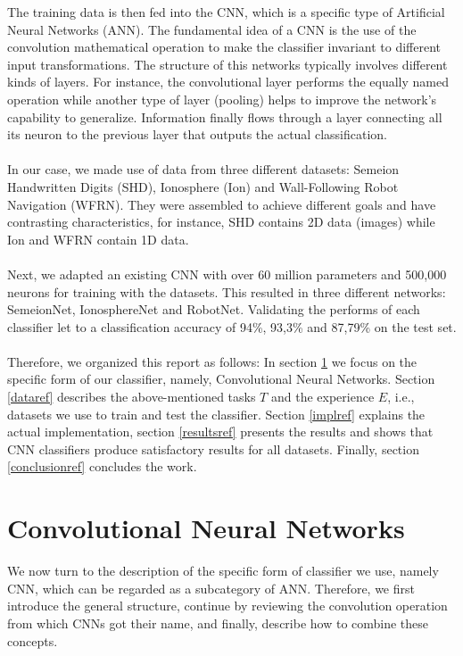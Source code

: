 \documentclass[a4paper, 11pt, twoside, openright]{article}
\begin{document}
The training data is then fed into the CNN, which is a specific type of Artificial Neural Networks (ANN). The fundamental idea of a CNN is the use of the convolution mathematical operation to make the classifier invariant to different input transformations. The structure of this networks typically involves different kinds of layers. For instance, the convolutional layer performs the equally named operation while another type of layer (pooling) helps to improve the network's capability to generalize. Information finally flows through a layer connecting all its neuron to the previous layer that outputs the actual classification.
\\ \\
In our case, we made use of data from three different datasets: Semeion Handwritten Digits (SHD), Ionosphere (Ion) and Wall-Following Robot Navigation (WFRN). They were assembled to achieve different goals and have contrasting characteristics, for instance, SHD contains 2D data (images) while Ion and WFRN contain 1D data.
\\ \\
Next, we adapted an existing CNN with over 60 million parameters and 500,000 neurons for training with the datasets. This resulted in three different networks: SemeionNet, IonosphereNet and RobotNet. Validating the performs of each classifier let to a classification accuracy of 94\%, 93,3\% and 87,79\% on the test set.
\\ \\
Therefore, we organized this report as follows: In section \ref{cnnref} we focus on the specific form of our classifier, namely, Convolutional Neural Networks. Section \ref{dataref} describes the above-mentioned tasks $T$ and the experience $E$, i.e., datasets we use to train and test the classifier. Section \ref{implref} explains the actual implementation, section \ref{resultsref} presents the results and shows that CNN classifiers produce satisfactory results for all datasets. Finally, section \ref{conclusionref} concludes the work.

\section{Convolutional Neural Networks} \label{cnnref}
We now turn to the description of the specific form of classifier we use, namely CNN, which can be regarded as a subcategory of ANN. Therefore, we first introduce the general structure, continue by reviewing the convolution operation from which CNNs got their name, and finally, describe how to combine these concepts.
\end{document}
